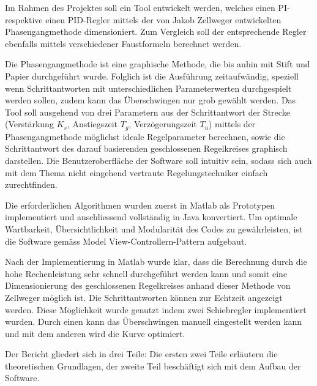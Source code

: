 Im Rahmen  des Projektes soll  ein Tool  entwickelt werden, welches  einen PI-
respektive  einen  PID-Regler mittels  der  von  Jakob Zellweger  entwickelten
Phasengangmethode dimensioniert. Zum  Vergleich soll der  entsprechende Regler
ebenfalls mittels verschiedener Faustformeln berechnet werden.

Die Phasengangmethode ist eine graphische Methode, die bis anhin mit Stift und
Papier  durchgef\"uhrt wurde. Folglich  ist die  Ausf\"uhrung zeitaufw\"andig,
speziell   wenn   Schrittantworten   mit   unterschiedlichen   Parameterwerten
durchgespielt werden sollen, zudem kann das \"Uberschwingen nur grob gew\"ahlt
werden. Das Tool  soll ausgehend  von drei  Parametern aus  der Schrittantwort
der  Strecke  (Verst\"arkung  $K_s$,  Anstiegszeit  $T_g$,  Verz\"ogerungszeit
$T_u$)  mittels   der  Phasengangmethode  m\"oglichst   ideale  Regelparameter
berechnen,  sowie  die  Schrittantwort des  darauf  basierenden  geschlossenen
Regelkreises graphisch darstellen. Die  Benutzeroberfl\"ache der Software soll
intuitiv  sein, sodass  sich  auch  mit dem  Thema  nicht eingehend  vertraute
Regelungstechniker einfach zurechtfinden.

Die  erforderlichen  Algorithmen  wurden   zuerst  in  Matlab  als  Prototypen
implementiert   und  anschliessend   vollst\"andig  in   Java  konvertiert. Um
optimale  Wartbarkeit,  \"Ubersichtlichkeit  und Modularit\"at  des  Codes  zu
gew\"ahrleisten,  ist  die  Software gem\"ass  Model  View-Controllern-Pattern
aufgebaut.

Nach  der Implementierung  in Matlab  wurde  klar, dass  die Berechnung  durch
die  hohe Rechenleistung  sehr schnell  durchgef\"uhrt werden  kann und  somit
eine  Dimensionierung des  geschlossenen  Regelkreises  anhand dieser  Methode
von  Zellweger  m\"oglich  ist. Die  Schrittantworten  k\"onnen  zur  Echtzeit
angezeigt werden. Diese  M\"oglichkeit wurde  genutzt indem  zwei Schiebregler
implementiert wurden. Durch einen kann das \"Uberschwingen manuell eingestellt
werden kann und mit dem anderen wird die Kurve optimiert.

Der Bericht gliedert sich in drei Teile: Die ersten zwei Teile erl\"autern die
theoretischen Grundlagen,  der zweite Teil  besch\"aftigt sich mit  dem Aufbau
der Software.
